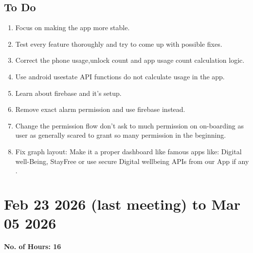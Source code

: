 \documentclass[12pt]{article}
\begin{document}
\begin{enumerate}
    \subsection{To Do}
    \begin{enumerate}
        \item Focus on making the app more stable.
        \item Test every feature thoroughly and try to come up with possible fixes.
        \item Correct the phone usage,unlock count and app usage count calculation logic.
        \item Use android usestate API functions do not calculate usage in the app.
        \item Learn about firebase and it's setup.
        \item Remove exact alarm permission and use firebase instead.
        \item Change the permission flow don't ask to much permission on on-boarding as user as generally scared to grant so many permission in the beginning.
        \item Fix graph layout: Make it a proper dashboard like famous apps like: Digital well-Being, StayFree or use secure Digital wellbeing APIs from our App if any .
    \end{enumerate}
    \section{Feb 23 2026 (last meeting) to Mar 05 2026}
    {\bf No. of Hours: 16}

\end{enumerate}
\end{document}
